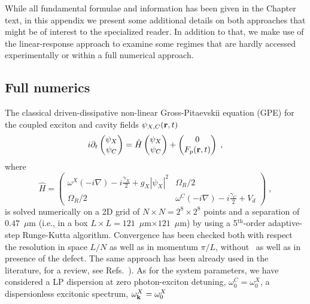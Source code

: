 \begin{subappendices}
While all fundamental formulae and information has been given in the
Chapter text, in this appendix we present some additional details on
both approaches that might be of interest to the specialized reader.
In addition to that, we make use of the linear-response approach to
examine some regimes that are hardly accessed experimentally or within
a full numerical approach.


\subsection{Full numerics}
\label{subsec:detun}
The classical driven-dissipative non-linear Gross-Pitaevskii equation
(GPE) for the coupled exciton and cavity fields $\psi_{X,C}
(\mathbf{r},t)$
%
\begin{equation}
  i\partial_t \begin{pmatrix} \psi_X \\ \psi_C \end{pmatrix} =
  \hat{H} \begin{pmatrix} \psi_X \\ \psi_C \end{pmatrix}
  + \begin{pmatrix} 0 \\ F_p(\mathbf{r},t) \end{pmatrix}\; ,
\label{eq:numer}
\end{equation}
%
where
%
\begin{equation}
  \hat{H} = \begin{pmatrix} \omega^{X}(-i\nabla) - i
    \frac{\gamma_X}{2} + g_X |\psi_X|^2 & \Omega_R/2 \\ \Omega_R/2 &
    \omega^C(-i\nabla) - i \frac{\gamma_C}{2} + V_d \end{pmatrix} \;
  ,
\end{equation}
%
is solved numerically on a 2D grid of $N\times N=2^8\times 2^8$ points
and a separation of $0.47$~$\mu$m (i.e., in a box $L\times L =
121$~$\mu$m$\times 121$~$\mu$m) by using a 5$^{\text{th}}$-order
adaptive-step Runge-Kutta algorithm. Convergence has been checked both
with respect the resolution in space $L/N$ as well as in momentum
$\pi/L$, without~\cite{Marchetti_2010,9783642241857} as well as in
presence of the defect.
%
The same approach has been already used in the literature, for a
review, see Refs.~\cite{Marchetti_2010,9783642241857}).
%
As for the system parameters, we have considered a LP dispersion at
zero photon-exciton detuning, $\omega^C_0 = \omega^X_0$, a
dispersionless excitonic spectrum, $\omega^X_{\mathbf{k}} = \omega^X_0$

\end{subappendices}
